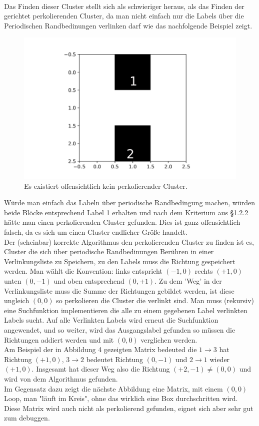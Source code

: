 \documentclass[a4paper, 12pt]{scrartcl}
\begin{document}
\\
\noindent Das Finden dieser Cluster stellt sich als schwieriger heraus, als das Finden der gerichtet perkolierenden Cluster, da man nicht einfach nur die Labels über die Periodischen Randbedinungen verlinken darf wie das nachfolgende Beispiel zeigt.
\begin{figure}[h!]
	\centering
	\includegraphics[scale=0.6]{noperc1.pdf}
	\caption{Es existiert offensichtlich kein perkolierender Cluster.}
\end{figure}

\vspace{0.5cm}
\noindent Würde man einfach das Labeln über periodische Randbedingung machen, würden beide Blöcke entsprechend Label 1 erhalten und nach dem Kriterium aus §1.2.2 hätte man einen perkolierenden Cluster gefunden. Dies ist ganz offensichtlich falsch, da es sich um einen Cluster endlicher Größe handelt.
\\
\noindent Der (scheinbar) korrekte Algorithmus den perkolierenden Cluster zu finden ist es, Cluster die sich über periodische Randbedinungen Berühren in einer Verlinkungsliste zu Speichern, zu den Labels muss die Richtung gespeichert werden. Man wählt die Konvention: links entspricht $(-1,0)$ rechts $(+1,0)$ unten $(0,-1)$ und oben entsprechend $(0,+1)$. Zu dem 'Weg' in der Verlinkungsliste muss die Summe der Richtungen gebildet werden, ist diese ungleich $(0,0)$ so perkolieren die Cluster die verlinkt sind. Man muss (rekursiv) eine Suchfunktion implementieren die alle zu einem gegebenen Label verlinkten Labels sucht. Auf alle Verlinkten Labels wird erneut die Suchfunktion angewendet, und so weiter, wird das Ausgangslabel gefunden so müssen die Richtungen addiert werden und mit $(0,0)$ verglichen werden.
\\
\noindent Am Beispiel der in Abbildung 4 gezeigten Matrix bedeuted die $1 \rightarrow 3$ hat Richtung $(+1,0)$, $3 \rightarrow 2$ bedeutet Richtung $(0,-1)$ und $2 \rightarrow 1$ wieder $(+1,0)$. Insgesamt hat dieser Weg also die Richtung $(+2,-1) \neq (0,0)$ und wird von dem Algorithmus gefunden.
\\
\noindent Im Gegensatz dazu zeigt die nächste Abbildung eine Matrix, mit einem $(0,0)$ Loop, man "läuft im Kreis", ohne das wirklich eine Box durchschritten wird. Diese Matrix wird auch nicht als perkolierend gefunden, eignet sich aber sehr gut zum debuggen.
\end{document}

